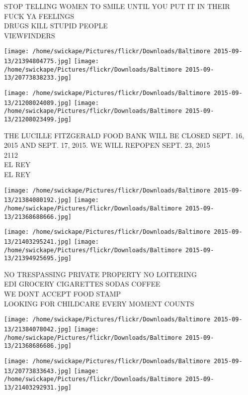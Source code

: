 \documentclass[10pt,letterpaper]{article}
\begin{document}
STOP TELLING WOMEN TO SMILE UNTIL YOU PUT IT IN THEIR\\
FUCK YA FEELINGS\\
DRUGS KILL STUPID PEOPLE\\
VIEWFINDERS\\
\pagebreak

\texttt{[image: /home/swickape/Pictures/flickr/Downloads/Baltimore 2015-09-13/21394804775.jpg]}
\texttt{[image: /home/swickape/Pictures/flickr/Downloads/Baltimore 2015-09-13/20773838233.jpg]}

\texttt{[image: /home/swickape/Pictures/flickr/Downloads/Baltimore 2015-09-13/21208024089.jpg]}
\texttt{[image: /home/swickape/Pictures/flickr/Downloads/Baltimore 2015-09-13/21208023499.jpg]}

THE LUCILLE FITZGERALD FOOD BANK WILL BE CLOSED SEPT. 16, 2015 AND SEPT. 17, 2015.  WE WILL REPOPEN SEPT. 23, 2015\\
2112\\
EL REY\\
EL REY\\
\pagebreak

\texttt{[image: /home/swickape/Pictures/flickr/Downloads/Baltimore 2015-09-13/21384080192.jpg]}
\texttt{[image: /home/swickape/Pictures/flickr/Downloads/Baltimore 2015-09-13/21368688666.jpg]}

\texttt{[image: /home/swickape/Pictures/flickr/Downloads/Baltimore 2015-09-13/21403295241.jpg]}
\texttt{[image: /home/swickape/Pictures/flickr/Downloads/Baltimore 2015-09-13/21394925695.jpg]}

NO TRESPASSING PRIVATE PROPERTY NO LOITERING\\
EDI GROCERY CIGARETTES SODAS COFFEE\\
WE DONT ACCEPT FOOD STAMP\\
LOOKING FOR CHILDCARE EVERY MOMENT COUNTS\\
\pagebreak

\texttt{[image: /home/swickape/Pictures/flickr/Downloads/Baltimore 2015-09-13/21384078042.jpg]}
\texttt{[image: /home/swickape/Pictures/flickr/Downloads/Baltimore 2015-09-13/21368686686.jpg]}

\texttt{[image: /home/swickape/Pictures/flickr/Downloads/Baltimore 2015-09-13/20773833643.jpg]}
\texttt{[image: /home/swickape/Pictures/flickr/Downloads/Baltimore 2015-09-13/21403292931.jpg]}
\end{document}
